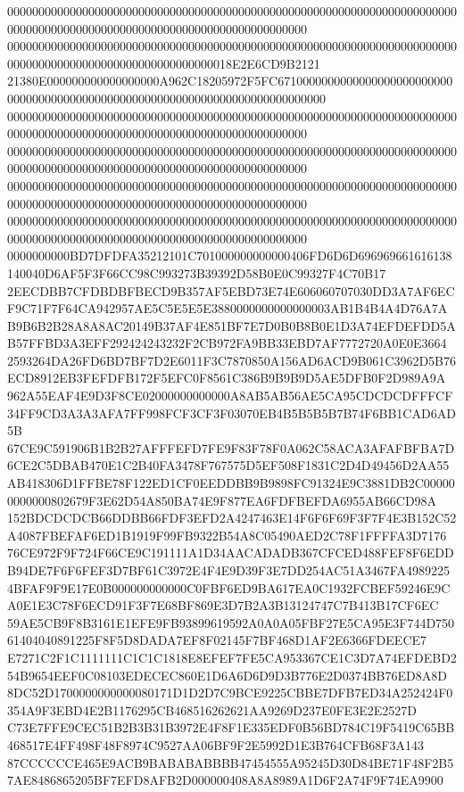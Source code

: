 \documentclass[UTF8,fontset=fandol,zihao=-4,a4paper]{ctexart}
\begin{document}
{{000000000000000000000000000000000000000000000000000000000000000000000000000000000000000000000000000000000000000000000000
000000000000000000000000000000000000000000000000000000000000000000000000000000000000000000000000000000000018E2E6CD9B2121
21380E000000000000000000A962C18205972F5FC6710000000000000000000000000000000000000000000000000000000000000000000000000000
000000000000000000000000000000000000000000000000000000000000000000000000000000000000000000000000000000000000000000000000
000000000000000000000000000000000000000000000000000000000000000000000000000000000000000000000000000000000000000000000000
000000000000000000000000000000000000000000000000000000000000000000000000000000000000000000000000000000000000000000000000
000000000000000000000000000000000000000000000000000000000000000000000000000000000000000000000000000000000000000000000000
0000000000BD7DFDFA35212101C701000000000000406FD6D6D696969661616138140040D6AF5F3F66CC98C993273B39392D58B0E0C99327F4C70B17
2EECDBB7CFDBDBFBECD9B357AF5EBD73E74E606060707030DD3A7AF6ECF9C71F7F64CA942957AE5C5E5E5E3880000000000000003AB1B4B4A4D76A7A
B9B6B2B28A8A8AC20149B37AF4E851BF7E7D0B0B8B0E1D3A74EFDEFDD5AB57FFBD3A3EFF292424243232F2CB972FA9BB33EBD7AF7772720A0E0E3664
2593264DA26FD6BD7BF7D2E6011F3C7870850A156AD6ACD9B061C3962D5B76ECD8912EB3FEFDFB172F5EFC0F8561C386B9B9B9D5AE5DFB0F2D989A9A
962A55EAF4E9D3F8CE02000000000000A8AB5AB56AE5CA95CDCDCDFFFCF34FF9CD3A3A3AFA7FF998FCF3CF3F03070EB4B5B5B5B7B74F6BB1CAD6AD5B
67CE9C591906B1B2B27AFFFEFD7FE9F83F78F0A062C58ACA3AFAFBFBA7D6CE2C5DBAB470E1C2B40FA3478F767575D5EF508F1831C2D4D49456D2AA55
AB418306D1FFBE78F122ED1CF0EEDDBB9B9898FC91324E9C3881DB2C000000000000802679F3E62D54A850BA74E9F877EA6FDFBEFDA6955AB66CD98A
152BDCDCDCB66DDBB66FDF3EFD2A4247463E14F6F6F69F3F7F4E3B152C52A4087FBEFAF6ED1B1919F99FB9322B54A8C05490AED2C78F1FFFFA3D7176
76CE972F9F724F66CE9C191111A1D34AACADADB367CFCED488FEF8F6EDDB94DE7F6F6FEF3D7BF61C3972E4F4E9D39F3E7DD254AC51A3467FA4989225
4BFAF9F9E17E0B000000000000C0FBF6ED9BA617EA0C1932FCBEF59246E9CA0E1E3C78F6ECD91F3F7E68BF869E3D7B2A3B13124747C7B413B17CF6EC
59AE5CB9F8B3161E1EFE9FB93899619592A0A0A05FBF27E5CA95E3F744D75061404040891225F8F5D8DADA7EF8F02145F7BF468D1AF2E6366FDEECE7
E7271C2F1C1111111C1C1C1818E8EFEF7FE5CA953367CE1C3D7A74EFDEBD254B9654EEF0C08103EDECEC860E1D6A6D6D9D3B776E2D0374BB76ED8A8D
8DC52D1700000000000080171D1D2D7C9BCE9225CBBE7DFB7ED34A252424F0354A9F3EBD4E2B1176295CB468516262621AA9269D237E0FE3E2E2527D
C73E7FFE9CEC51B2B3B31B3972E4F8F1E335EDF0B56BD784C19F5419C65BB468517E4FF498F48F8974C9527AA06BF9F2E5992D1E3B764CFB68F3A143
87CCCCCCE465E9ACB9BABABABBBB47454555A95245D30D84BE71F48F2B57AE8486865205BF7EFD8AFB2D000000408A8A8989A1D6F2A74F9F74EA9900
}}
\end{document}
